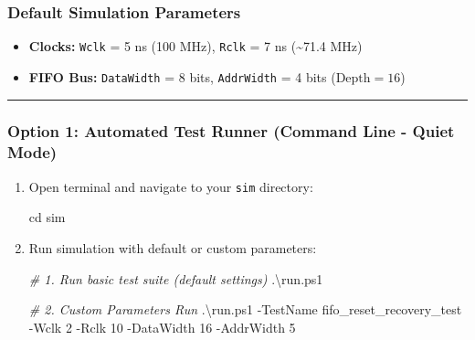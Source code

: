 \documentclass[
]{article}
\newenvironment{Shaded}{}{}
\newcommand{\BuiltInTok}[1]{\textcolor[rgb]{0.00,0.50,0.00}{#1}}
\newcommand{\CommentTok}[1]{\textcolor[rgb]{0.38,0.63,0.69}{\textit{#1}}}
\newcommand{\DecValTok}[1]{\textcolor[rgb]{0.25,0.63,0.44}{#1}}
\newcommand{\FunctionTok}[1]{\textcolor[rgb]{0.02,0.16,0.49}{#1}}
\newcommand{\NormalTok}[1]{#1}
\newcommand{\OperatorTok}[1]{\textcolor[rgb]{0.40,0.40,0.40}{#1}}
\providecommand{\tightlist}{%
  \setlength{\itemsep}{0pt}\setlength{\parskip}{0pt}}
\begin{document}
\subsubsection{Default Simulation
Parameters}\label{default-simulation-parameters}

\begin{itemize}
\tightlist
\item
  \textbf{Clocks:} \texttt{Wclk} = 5 ns (100 MHz), \texttt{Rclk} = 7 ns
  (\textasciitilde71.4 MHz)
\item
  \textbf{FIFO Bus:} \texttt{DataWidth} = 8 bits, \texttt{AddrWidth} = 4
  bits (\(\text{Depth} = 16\))
\end{itemize}

\begin{center}\rule{0.5\linewidth}{0.5pt}\end{center}

\subsubsection{Option 1: Automated Test Runner (Command Line - Quiet
Mode)}\label{option-1-automated-test-runner-command-line---quiet-mode}

\begin{enumerate}
\def\labelenumi{\arabic{enumi}.}
\tightlist
\item
  Open terminal and navigate to your \texttt{sim} directory:

\begin{Shaded}
\begin{Highlighting}[]
\BuiltInTok{cd}\NormalTok{ sim}
\end{Highlighting}
\end{Shaded}
\item
  Run simulation with default or custom parameters:

\begin{Shaded}
\begin{Highlighting}[]
\CommentTok{\# 1. Run basic test suite (default settings)}
\OperatorTok{.}\NormalTok{\textbackslash{}run}\OperatorTok{.}\FunctionTok{ps1}

\CommentTok{\# 2. Custom Parameters Run}
\OperatorTok{.}\NormalTok{\textbackslash{}run}\OperatorTok{.}\FunctionTok{ps1} \OperatorTok{{-}}\NormalTok{TestName fifo\_reset\_recovery\_test }\OperatorTok{{-}}\NormalTok{Wclk }\DecValTok{2} \OperatorTok{{-}}\NormalTok{Rclk }\DecValTok{10} \OperatorTok{{-}}\NormalTok{DataWidth }\DecValTok{16} \OperatorTok{{-}}\NormalTok{AddrWidth }\DecValTok{5}
\end{Highlighting}
\end{Shaded}
\end{enumerate}
\end{document}
